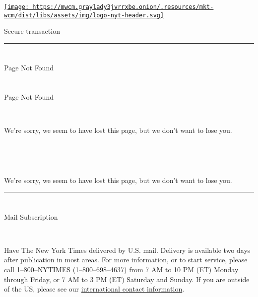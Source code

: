 \href{https://www.nytimes3xbfgragh.onion/}{\texttt{[image: https://mwcm.graylady3jvrrxbe.onion/.resources/mkt-wcm/dist/libs/assets/img/logo-nyt-header.svg]}}

Secure transaction

\begin{center}\rule{0.5\linewidth}{\linethickness}\end{center}

\section{}

Page Not Found

\hypertarget{-1}{%
\section{}\label{-1}}

Page Not Found

~

We're sorry, we seem to have lost this page, but we don't want to lose
you.

~

~

We're sorry, we seem to have lost this page, but we don't want to lose
you.

\begin{center}\rule{0.5\linewidth}{\linethickness}\end{center}

\hypertarget{-2}{%
\section{}\label{-2}}

\hypertarget{-3}{%
\section{}\label{-3}}

Mail Subscription

~

Have The New York Times delivered by U.S. mail. Delivery is available
two days after publication in most areas. For more information, or to
start service, please call 1--800--NYTIMES (1--800--698--4637) from 7 AM
to 10 PM (ET) Monday through Friday, or 7 AM to 3 PM (ET) Saturday and
Sunday. If you are outside of the US, please see our
\href{https://help.nytimes3xbfgragh.onion/hc/en-us/articles/115014792927-International-contact-info}{international
contact information}.

